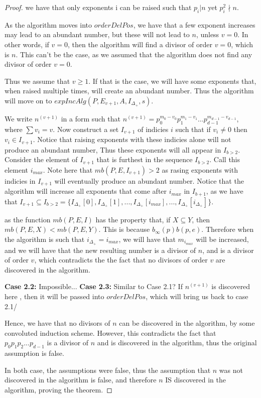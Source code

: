 \documentclass[../paper.tex]{subfiles}
\begin{document}
\begin{proof}
we have that
only exponents i can be raised such that $p_i | n$ yet $p_i^2
\nmid n$. 

  As the algorithm moves into $orderDelPos$, we have that a few
exponent increases may lead to an abundant number, but these will
not lead to $n$, unless $v = 0$. In other words, if $v= 0$, then
the algorithm will find a divisor of order $v = 0$, which is $n$.
This can't be the case, as we assumed that the algorithm does not
find any divisor of order $v = 0$.

  Thus we assume that $v \geq 1$. If that is the case, we will
have some exponents that, when raised multiple times, will create
an abundant number. Thus the algorithm will move on to
$expIncAlg(P,E_{v+1},A, I_{\Delta_+}, s)$.

  We write $n^{(v + 1)}$ in a form such that $n^{(v + 1)} =
p_0^{m_0 - v_0} p_1 ^{m_1 - v_1} ... p_{d-1}^{m_{d-1} - v_{d-1}}$,
where $\sum v_i = v$. Now construct a set $I_{v+1}$ of indicies 
$i$ such that if $v_i \neq 0$ then $v_i \in I_{v+1}$. Notice that
raising exponents with these indicies alone will not produce an 
abundant number, Thus these exponents will all appear in $I_{b >
2}$. Consider the element of $I_{v+1}$ that is furthest in the
sequence $I_{b > 2}$. Call this element $i_{max}$. Note here that
$mb(P,E,I_{v+1}) > 2$ as rasing exponents with indicies in 
$I_{v+1}$ will eventually produce an abundant number. Notice that the
algorithm will increase all exponents that come after $i_{max}$ in
$I_{b+1}$,
as we have that $I_{v + 1} \subseteq I_{b > 2} = 
                          \{I_{\Delta_{+}}[0], I_{\Delta_{+}}[1], 
	                        ..., I_{\Delta_{+}}[i_{max}],...,
                          I_{\Delta_{+}}[i_{\Delta_+}]\}$.

as the function $mb(P,E,I)$ has the property that, if $X \subseteq
Y$, then $mb(P,E,X) < mb (P,E,Y)$. This is because $b_{\infty}(p)
b(p,e)$. Therefore when the algorithm is such that
$i_{\Delta_{+}} = i_{max}$, we will have that $m_{i_{max}}$ will
be increased, and we will have that the new resulting number is a
divisor of $n$, and is a divisor of order $v$, which contradicts
the the fact that no divisors of order $v$ are discovered in the
algorithm.  

\textbf{Case 2.2:}
Impossible...
\textbf{Case 2.3:}
Similar to Case 2.1?
If $n^{(v+1)}$ is discovered here , then it will be passed into
$orderDelPos$, which will bring us back to case 2.1/

Hence, we have that no divisors of $n$ can be discovered in the
algorithm, by some convoluted induction scheme. However, this
contradicts the fact that $p_0 p_1 p_2 ... p_{d-1}$ is a divisor
of $n$ and is discovered in the algorithm, thus the original
assumption is false.

In both case, the assumptions were false, thus the assumption that
$n$ was not discovered in the algorithm is false, and therefore
$n$ IS discovered in the algorithm, proving the theorem.

\end{proof}
\end{document}
